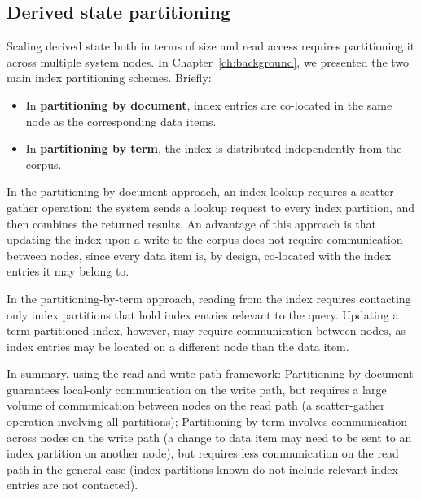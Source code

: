 
\subsection{Derived state partitioning}
\label{sec:index_partitioning_design_space}


Scaling derived state both in terms of size and read access requires partitioning it across multiple system nodes.
In Chapter~\ref{ch:background}, we presented the two main index partitioning schemes.
Briefly:

\begin{itemize}
  \item In \textbf{partitioning by document}, index entries are co-located in the same node as the corresponding
  data items.
  \item In \textbf{partitioning by term}, the index is distributed independently from the corpus.
\end{itemize}

In the partitioning-by-document approach, an index lookup requires a scatter-gather operation:
the system sends a lookup request to every index partition, and then combines the returned results.
An advantage of this approach is that updating the index upon a write to the corpus does not require communication between nodes,
since every data item is, by design, co-located with the index entries it may belong to.

In the partitioning-by-term approach, reading from the index requires contacting only index partitions that hold index entries
relevant to the query.
Updating a term-partitioned index, however, may require communication between nodes,
as index entries may be located on a different node than the data item.

In summary, using the read and write path framework:
Partitioning-by-document guarantees local-only communication on the write path, but requires a large volume of
communication between nodes on the read path (a scatter-gather operation involving all partitions);
Partitioning-by-term involves communication across nodes on the write path (a change to data item may need to be sent to
an index partition on another node),
but requires less communication on the read path in the general case
(index partitions known do not include relevant index entries are not contacted).

